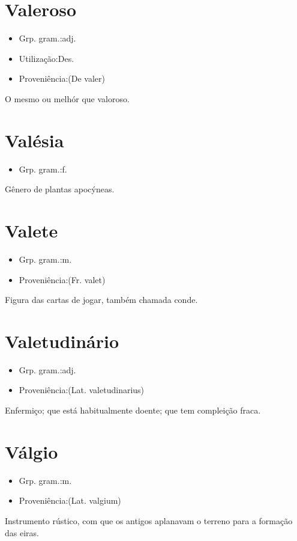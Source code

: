 \documentclass{article}
\begin{document}
\section{Valeroso}
\begin{itemize}
\item {Grp. gram.:adj.}
\end{itemize}
\begin{itemize}
\item {Utilização:Des.}
\end{itemize}
\begin{itemize}
\item {Proveniência:(De \textunderscore valer\textunderscore )}
\end{itemize}
O mesmo ou melhór que \textunderscore valoroso\textunderscore .
\section{Valésia}
\begin{itemize}
\item {Grp. gram.:f.}
\end{itemize}
Gênero de plantas apocýneas.
\section{Valete}
\begin{itemize}
\item {Grp. gram.:m.}
\end{itemize}
\begin{itemize}
\item {Proveniência:(Fr. \textunderscore valet\textunderscore )}
\end{itemize}
Figura das cartas de jogar, também chamada \textunderscore conde\textunderscore .
\section{Valetudinário}
\begin{itemize}
\item {Grp. gram.:adj.}
\end{itemize}
\begin{itemize}
\item {Proveniência:(Lat. \textunderscore valetudinarius\textunderscore )}
\end{itemize}
Enfermiço; que está habitualmente doente; que tem compleição fraca.
\section{Válgio}
\begin{itemize}
\item {Grp. gram.:m.}
\end{itemize}
\begin{itemize}
\item {Proveniência:(Lat. \textunderscore valgium\textunderscore )}
\end{itemize}
Instrumento rústico, com que os antigos aplanavam o terreno para a formação das eiras.
\end{document}

